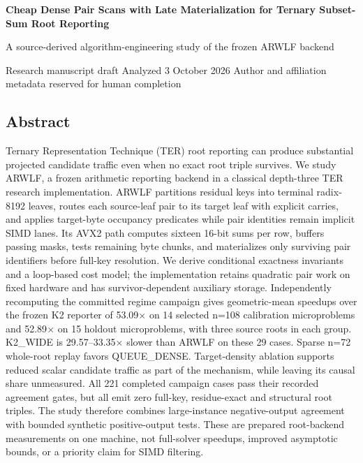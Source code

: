 \documentclass[10pt,letterpaper]{article}
\begin{document}
{\centering\sffamily\fontsize{25}{29}\selectfont\bfseries\color{navy}Cheap Dense Pair Scans with Late Materialization for Ternary Subset-Sum Root Reporting\par}\vspace{8pt}

{\centering\color{teal}A source-derived algorithm-engineering study of the frozen ARWLF backend\par}\vspace{6pt}

Research manuscript draft \textbullet{} Analyzed 3 October 2026 \textbullet{} Author and affiliation metadata reserved for human completion


\subsection*{Abstract}

Ternary Representation Technique (TER) root reporting can produce substantial projected candidate traffic even when no exact root triple survives. We study ARWLF, a frozen arithmetic reporting backend in a classical depth-three TER research implementation. ARWLF partitions residual keys into terminal radix-8192 leaves, routes each source-leaf pair to its target leaf with explicit carries, and applies target-byte occupancy predicates while pair identities remain implicit SIMD lanes. Its AVX2 path computes sixteen 16-bit sums per row, buffers passing masks, tests remaining byte chunks, and materializes only surviving pair identifiers before full-key resolution. We derive conditional exactness invariants and a loop-based cost model; the implementation retains quadratic pair work on fixed hardware and has survivor-dependent auxiliary storage. Independently recomputing the committed regime campaign gives geometric-mean speedups over the frozen K2 reporter of 53.09\ensuremath{\times} on 14 selected n=108 calibration microproblems and 52.89\ensuremath{\times} on 15 holdout microproblems, with three source roots in each group. K2\_WIDE is 29.57--33.35\ensuremath{\times} slower than ARWLF on these 29 cases. Sparse n=72 whole-root replay favors QUEUE\_DENSE. Target-density ablation supports reduced scalar candidate traffic as part of the mechanism, while leaving its causal share unmeasured. All 221 completed campaign cases pass their recorded agreement gates, but all emit zero full-key, residue-exact and structural root triples. The study therefore combines large-instance negative-output agreement with bounded synthetic positive-output tests. These are prepared root-backend measurements on one machine, not full-solver speedups, improved asymptotic bounds, or a priority claim for SIMD filtering.
\end{document}
